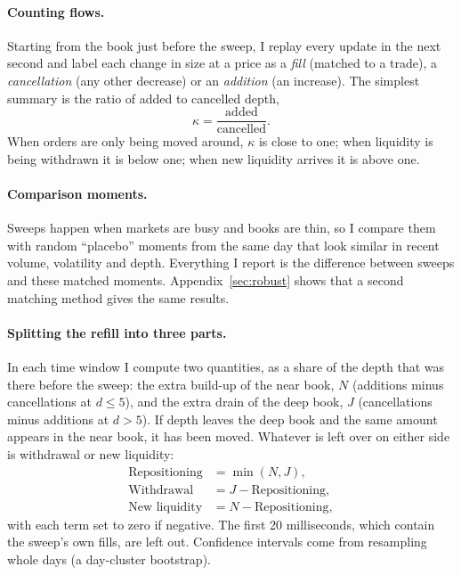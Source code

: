 \documentclass[12pt]{article}
\begin{document}
\paragraph{Counting flows.} Starting from the book just before the sweep, I replay every update
in the next second and label each change in size at a price as a \emph{fill} (matched to a
trade), a \emph{cancellation} (any other decrease) or an \emph{addition} (an increase). The
simplest summary is the ratio of added to cancelled depth,
\begin{equation}
  \kappa = \frac{\text{added}}{\text{cancelled}}.
\end{equation}
When orders are only being moved around, $\kappa$ is close to one; when liquidity is being
withdrawn it is below one; when new liquidity arrives it is above one.

\paragraph{Comparison moments.} Sweeps happen when markets are busy and books are thin, so I
compare them with random ``placebo'' moments from the same day that look similar in recent
volume, volatility and depth. Everything I report is the difference between sweeps and these
matched moments. Appendix~\ref{sec:robust} shows that a second matching method gives the same
results.

\paragraph{Splitting the refill into three parts.} In each time window I compute two quantities,
as a share of the depth that was there before the sweep: the extra build-up of the near book,
$N$ (additions minus cancellations at $d \le 5$), and the extra drain of the deep book, $J$
(cancellations minus additions at $d > 5$). If depth leaves the deep book and the same amount
appears in the near book, it has been moved. Whatever is left over on either side is withdrawal
or new liquidity:
\begin{align}
  \text{Repositioning} &= \min(N, J), \\
  \text{Withdrawal} &= J - \text{Repositioning}, \\
  \text{New liquidity} &= N - \text{Repositioning},
\end{align}
with each term set to zero if negative. The first 20 milliseconds, which contain the sweep's own
fills, are left out. Confidence intervals come from resampling whole days (a day-cluster
bootstrap).
\end{document}
